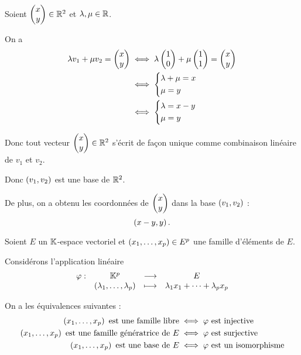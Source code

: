 \begin{corr}~\\
Soient \(\begin{pmatrix}x\\y\end{pmatrix}\in\mathbb{R}^2\) et \(\lambda,\mu\in\mathbb{R}\).

On a \[\begin{aligned}
\lambda v_1+\mu v_2=\begin{pmatrix}x\\y\end{pmatrix}&\iff\lambda\begin{pmatrix}1\\0\end{pmatrix}+\mu\begin{pmatrix}1\\1\end{pmatrix}=\begin{pmatrix}x\\y\end{pmatrix} \\
&\iff\begin{dcases}
\lambda+\mu=x \\
\mu=y
\end{dcases} \\
&\iff\begin{dcases}
\lambda=x-y \\
\mu=y
\end{dcases}
\end{aligned}\]

Donc tout vecteur \(\begin{pmatrix}x\\y\end{pmatrix}\in\mathbb{R}^2\) s'écrit de façon unique comme combinaison linéaire de \(v_1\) et \(v_2\).

Donc \(\left(v_1,v_2\right)\) est une base de \(\mathbb{R}^2\).

De plus, on a obtenu les coordonnées de \(\begin{pmatrix}x\\y\end{pmatrix}\) dans la base \(\left(v_1,v_2\right)\) : \[\left(x-y,y\right).\]
\end{corr}

\begin{prop}
Soient \(E\) un \(\mathbb{K}\)-espace vectoriel et \(\left(x_1,\dots,x_p\right)\in E^p\) une famille d'éléments de \(E\).

Considérons l'application linéaire \[\begin{array}[t]{cccc}\varphi : & \mathbb{K}^p & \longrightarrow & E \\ & \left(\lambda_1,\dots,\lambda_p\right) & \longmapsto & \lambda_1x_1+\dots+\lambda_px_p\end{array}\]

On a les équivalences suivantes : \[\begin{aligned}
\left(x_1,\dots,x_p\right)\text{ est une famille libre}&\iff\varphi\text{ est injective} \\
\left(x_1,\dots,x_p\right)\text{ est une famille génératrice de }E&\iff\varphi\text{ est surjective} \\
\left(x_1,\dots,x_p\right)\text{ est une base de }E&\iff\varphi\text{ est un isomorphisme}
\end{aligned}\]
\end{prop}

